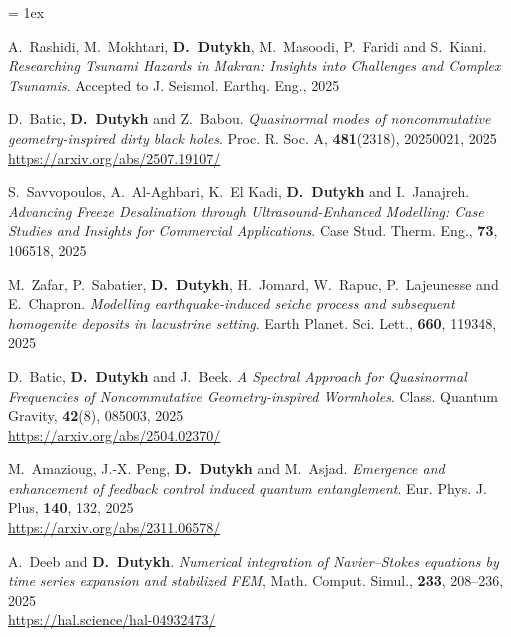 \listpartsep = 1ex

\begin{etaremune}

  

  \item A.~Rashidi, M.~Mokhtari, \textbf{D.~Dutykh}, M.~Masoodi, P.~Faridi and S.~Kiani. \textit{Researching Tsunami Hazards in Makran: Insights into Challenges and Complex Tsunamis}. Accepted to J. Seismol. Earthq. Eng., 2025 %

  \item D.~Batic, \textbf{D.~Dutykh} and Z.~Babou. \textit{Quasinormal modes of noncommutative geometry-inspired dirty black holes}. Proc. R. Soc. A, \textbf{481}(2318), 20250021, 2025 \\ %
  \url{https://arxiv.org/abs/2507.19107/}

  \item S.~Savvopoulos, A.~Al-Aghbari, K.~El Kadi, \textbf{D.~Dutykh} and I.~Janajreh. \textit{Advancing Freeze Desalination through Ultrasound-Enhanced Modelling: Case Studies and Insights for Commercial Applications}. Case Stud. Therm. Eng., \textbf{73}, 106518, 2025 %

  \item M.~Zafar, P.~Sabatier, \textbf{D.~Dutykh}, H.~Jomard, W.~Rapuc, P.~Lajeunesse and E.~Chapron. \textit{Modelling earthquake-induced seiche process and subsequent homogenite deposits in lacustrine setting}. Earth Planet. Sci. Lett., \textbf{660}, 119348, 2025 %

  \item D.~Batic, \textbf{D.~Dutykh} and J.~Beek. \textit{A Spectral Approach for Quasinormal Frequencies of Noncommutative Geometry-inspired Wormholes}. Class. Quantum Gravity, \textbf{42}(8), 085003, 2025 \\ %
  \url{https://arxiv.org/abs/2504.02370/}

  \item M.~Amazioug, J.-X. Peng, \textbf{D.~Dutykh} and M.~Asjad. \textit{Emergence and enhancement of feedback control induced quantum entanglement}. Eur. Phys. J. Plus, \textbf{140}, 132, 2025 \\ %
  \url{https://arxiv.org/abs/2311.06578/}

  \item A.~Deeb and \textbf{D.~Dutykh}. \textit{Numerical integration of Navier--Stokes equations by time series expansion and stabilized FEM}, Math. Comput. Simul., \textbf{233}, 208--236, 2025 \\ %
  \url{https://hal.science/hal-04932473/}


\end{etaremune}
